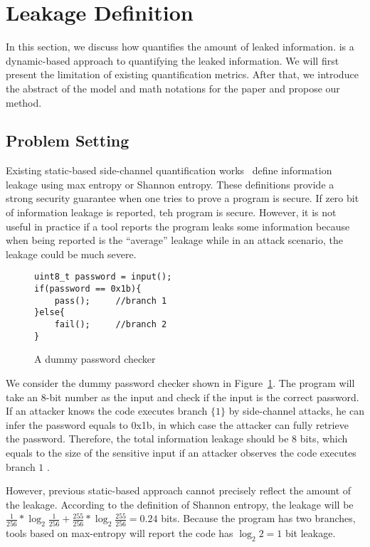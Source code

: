 \section{\tool{} Leakage Definition}
\label{sec:trace-qif}
In this section, we discuss how \tool{} quantifies the amount of leaked
information. \tool{} is a dynamic-based approach to quantifying the leaked
information. We will first present the limitation of existing quantification
metrics. After that, we introduce the abstract of the model and math notations
for the paper and propose our method.

\subsection{Problem Setting}
Existing static-based side-channel quantification
works~\cite{182946,Wichelmann:2018:MFF:3274694.3274741 } define information
leakage using max entropy or Shannon entropy. These definitions provide a strong
security guarantee when one tries to prove a program is secure.  If zero bit of
information leakage is reported, teh program is secure. However, it is not
useful in practice if a tool reports the program leaks some information because
when being reported is the ``average'' leakage while in an attack scenario, the
leakage could be much severe.


\begin{figure}[h!]
    \centering
    \begin{lstlisting}[xleftmargin=.03\textwidth,xrightmargin=.01\textwidth]
uint8_t password = input();
if(password == 0x1b){
    pass();     //branch 1
}else{
    fail();     //branch 2
}
\end{lstlisting}
    \caption{A dummy password checker}
    \label{fig:password-checker}
\end{figure}

We consider the dummy password checker shown in Figure~\ref{fig:password-checker}.
The program will take an 8-bit number as the input and check if the
input is the correct password. If an attacker knows the code executes branch
$\{{1\}}$ by side-channel attacks, he can infer the password equals to 0x1b, in
which case the attacker can fully retrieve the password. Therefore, the total
information leakage should be 8 bits, which equals to the size of the sensitive
input if an attacker observes the code executes branch $1$ .

However, previous static-based approach cannot precisely reflect the amount of
the leakage. According to the definition of Shannon entropy, the leakage will be
$\frac{1}{256}*\log_{2}\frac{1}{256} + \frac{255}{256} *\log_{2}\frac{255}{256}=
0.24$ bits. Because the program has two branches, tools based on max-entropy
will report the code has $\log_2{2} = 1$ bit leakage.


